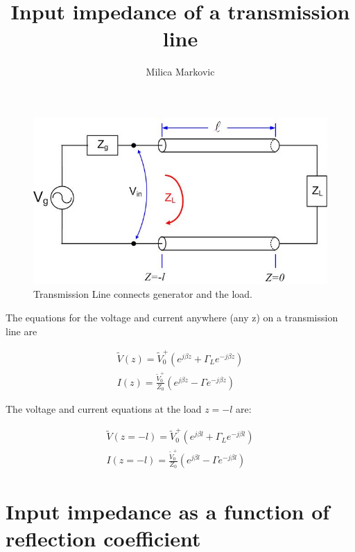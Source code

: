 \documentclass{ximera}
\title{Input impedance of a transmission line}
\author{Milica Markovic}
\begin{document}
  
\begin{abstract}  

\end{abstract}  
\maketitle    


\begin{figure}[htbp]
\begin{center}
\includegraphics[scale=0.3]{../jpg/trline.jpg}
\end{center}
\caption{Transmission Line connects generator and the load.}
\label{fig:TRLine}
\end{figure}


The equations for the voltage and current anywhere (any z) on a transmission line  are


\begin{eqnarray}
\tilde{V}(z)= \tilde{V}_0^+ (e^{j \beta z} + \Gamma_L  e^{-j \beta z }  ) \label{eq:vtlfin} \\
I(z)=   \frac{\tilde{V}_0^+}{Z_0}  (e^{j \beta z} - \Gamma  e^{-j \beta z}  ) \label{eq:itlfin}
\end{eqnarray}


The voltage and current equations at the load $z=-l$ are:

\begin{eqnarray}
\tilde{V}(z=-l)= \tilde{V}_0^+ (e^{j \beta l} + \Gamma_L  e^{-j \beta l }  )  \\
I(z=-l)=   \frac{\tilde{V}_0^+}{Z_0}  (e^{j \beta l} - \Gamma  e^{-j \beta l}  ) 
\end{eqnarray}


\section{Input impedance as a function of reflection coefficient}
\end{document}
